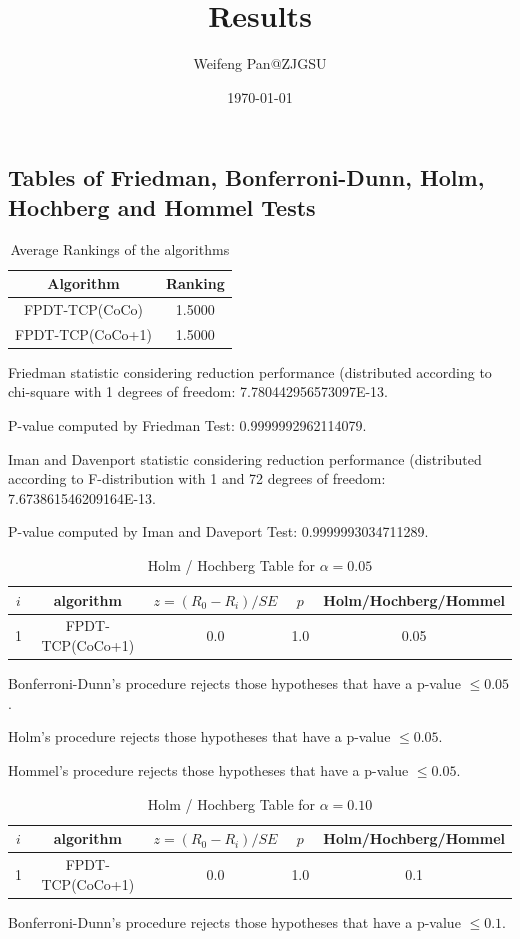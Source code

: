 \documentclass[a4paper,10pt]{article}
\title{Results}
\author{Weifeng Pan@ZJGSU}
\date{\today}
\begin{document}
\begin{landscape}
\oddsidemargin 0in \topmargin 0in\maketitle
\section{Tables of Friedman, Bonferroni-Dunn, Holm, Hochberg and Hommel Tests}
\begin{table}[!htp]
\centering
\caption{Average Rankings of the algorithms
}\begin{tabular}{c|c}
Algorithm&Ranking\\
\hline
FPDT-TCP(CoCo)&1.5000\\
FPDT-TCP(CoCo+1)&1.5000\\
\end{tabular}
\end{table}


Friedman statistic considering reduction performance (distributed according to chi-square with 1 degrees of freedom: 7.780442956573097E-13.


P-value computed by Friedman Test: 0.9999992962114079.\newline

Iman and Davenport statistic considering reduction performance (distributed according to F-distribution with 1 and 72 degrees of freedom: 7.673861546209164E-13.


P-value computed by Iman and Daveport Test: 0.9999993034711289.\newline

\begin{table}[!htp]
\centering\tiny
\caption{Holm / Hochberg Table for $\alpha=0.05$}
\begin{tabular}{ccccc}
$i$&algorithm&$z=(R_0 - R_i)/SE$&$p$&Holm/Hochberg/Hommel\\
\hline
1&FPDT-TCP(CoCo+1)&0.0&1.0&0.05\\
\hline
\end{tabular}
\end{table}
Bonferroni-Dunn's procedure rejects those hypotheses that have a p-value $\le0.05$.


Holm's procedure rejects those hypotheses that have a p-value $\le0.05$.


Hommel's procedure rejects those hypotheses that have a p-value $\le0.05$.


\begin{table}[!htp]
\centering\tiny
\caption{Holm / Hochberg Table for $\alpha=0.10$}
\begin{tabular}{ccccc}
$i$&algorithm&$z=(R_0 - R_i)/SE$&$p$&Holm/Hochberg/Hommel\\
\hline
1&FPDT-TCP(CoCo+1)&0.0&1.0&0.1\\
\hline
\end{tabular}
\end{table}
Bonferroni-Dunn's procedure rejects those hypotheses that have a p-value $\le0.1$.



\end{landscape}
\end{document}
